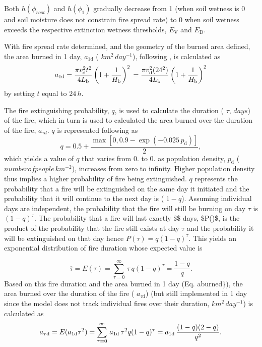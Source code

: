 Both $h(\phi_{root})$ and $h(\phi_{1})$ gradually decrease from 1 (when soil wetness is 0 and soil moisture does not constrain fire spread rate) to 0 when soil wetness exceeds the respective extinction wetness thresholds, $E_\mathrm{V}$ and $E_\mathrm{D}$.

With fire spread rate determined, and the geometry of the burned area defined, the area burned in 1 day, $a_{1{\mathrm{d}}}$ ( $km^2\,day^{-1}$), following \cite{Li20121c2}, is calculated as \[ a_{1{\mathrm{d}}} = \frac{\pi v_\mathrm{d}^2 t^2}{4L_\mathrm{b}}\left(1 + \frac{1}{H_\mathrm{b}}\right)^2 \nonumber\\ = \frac{\pi v_\mathrm{d}^2 (24^2)} {4L_\mathrm{b}}\left(1 + \frac{1}{H_\mathrm{b}}\right)^2\label{aburned} \] by setting $t$ equal to $24\,h$.

The fire extinguishing probability, $q$, is used to calculate the duration ( $\tau$, $days$) of the fire, which in turn is used to calculated the area burned over the duration of the fire, ${a_{\tau d}}$. $q$ is represented following \cite{Kloster2010-633} as \[ q = 0.5 + \frac{\max\left[0,0.9 - \exp(-0.025\,p_\mathrm{d})\right]}{2}, \] which yields a value of $q$ that varies from 0. to 0. as population density, $p_\mathrm{d}$ ( $number of people\,km^{-2}$), increases from zero to infinity. Higher population density thus implies a higher probability of fire being extinguished. $q$ represents the probability that a fire will be extinguished on the same day it initiated and the probability that it will continue to the next day is ( $1-q$). Assuming individual days are independent, the probability that the fire will still be burning on day $\tau$ is $(1-q)^\tau$. The probability that a fire will last exactly \$\$ days, \$\+P()\$, is the product of the probability that the fire still exists at day $\tau$ and the probability it will be extinguished on that day hence $P(\tau) = q(1-q)^\tau$. This yields an exponential distribution of fire duration whose expected value is

\[ \overline{\tau} = E(\tau) = \sum_{\tau=0}^\infty\,\tau\,q(1-q)^{\tau} = \frac{1-q}{q}. \] Based on this fire duration and the area burned in 1 day (Eq. aburned\}), the area burned over the duration of the fire ( $a_{\tau \mathrm{d}}$) (but still implemented in 1 day since the model does not track individual fires over their duration, $km^2\,day^{-1}$) is calculated as \[ a_{\tau \mathrm{d}} =E(a_{1{\mathrm{d}}} \tau^2)=\sum_{\tau=0}^ \infty\,a_{1{\mathrm{d}}}\,\tau^2 q(1-q)^{\tau} \\ = a_{1{\mathrm{d}}}\, \frac{(1-q) (2-q)}{q^2}.\nonumber \]

